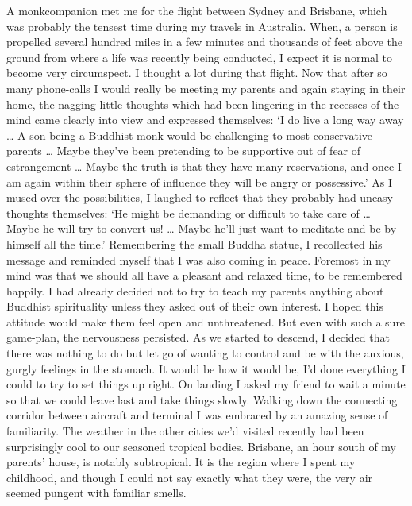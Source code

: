 A monkcompanion met me for the flight between Sydney and Brisbane, which
was probably the tensest time during my travels in Australia. When, a
person is propelled several hundred miles in a few minutes and thousands
of feet above the ground from where a life was recently being conducted, 
I expect it is normal to become very circumspect. I thought a lot during
that flight. Now that after so many phone-calls I would really be
meeting my parents and again staying in their home, the nagging little
thoughts which had been lingering in the recesses of the mind came
clearly into view and expressed themselves: `I do live a long way away
\ldots{} A son being a Buddhist monk would be challenging to most
conservative parents \ldots{} Maybe they've been pretending to be
supportive out of fear of estrangement \ldots{} Maybe the truth is that
they have many reservations, and once I am again within their sphere of
influence they will be angry or possessive.' As I mused over the
possibilities, I laughed to reflect that they probably had uneasy
thoughts themselves: `He might be demanding or difficult to take care of
\ldots{} Maybe he will try to convert us! \ldots{} Maybe he'll just want
to meditate and be by himself all the time.' Remembering the small
Buddha statue, I recollected his message and reminded myself that I was
also coming in peace. Foremost in my mind was that we should all have a
pleasant and relaxed time, to be remembered happily. I had already
decided not to try to teach my parents anything about Buddhist
spirituality unless they asked out of their own interest. I hoped this
attitude would make them feel open and unthreatened. But even with such
a sure game-plan, the nervousness persisted. As we started to descend, I
decided that there was nothing to do but let go of wanting to control
and be with the anxious, gurgly feelings in the stomach. It would be how
it would be, I'd done everything I could to try to set things up right. 
On landing I asked my friend to wait a minute so that we could leave
last and take things slowly. Walking down the connecting corridor
between aircraft and terminal I was embraced by an amazing sense of
familiarity. The weather in the other cities we'd visited recently had
been surprisingly cool to our seasoned tropical bodies. Brisbane, an
hour south of my parents' house, is notably subtropical. It is the
region where I spent my childhood, and though I could not say exactly
what they were, the very air seemed pungent with familiar smells. 

